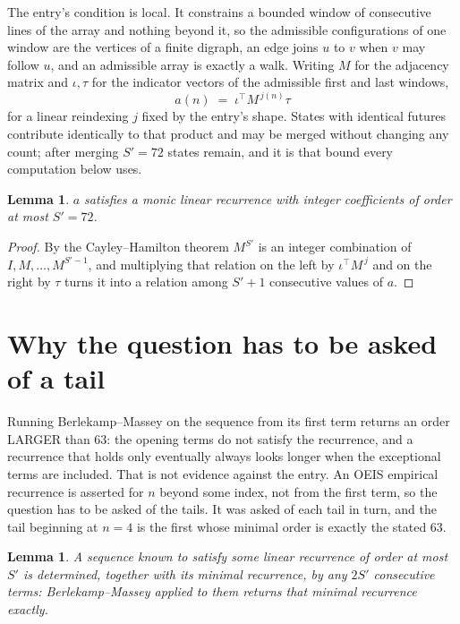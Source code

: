 \documentclass[11pt,a4paper]{article}
\theoremstyle{plain}
\newtheorem{lemma}[theorem]{Lemma}
\theoremstyle{definition}
\begin{document}
The entry's condition is local. It constrains a bounded window of consecutive lines of the
array and nothing beyond it, so the admissible configurations of one window are the vertices of
a finite digraph, an edge joins $u$ to $v$ when $v$ may follow $u$, and an admissible array is
exactly a walk. Writing $M$ for the adjacency matrix and $\iota,\tau$ for the indicator vectors
of the admissible first and last windows,
\[
a(n)\;=\;\iota^{\!\top}M^{\,j(n)}\tau
\]
for a linear reindexing $j$ fixed by the entry's shape. States with identical futures
contribute identically to that product and may be merged without changing any count; after
merging $S'=72$ states remain, and it is that bound every computation below uses.

\begin{lemma}\label{lem:cf}
$a$ satisfies a monic linear recurrence with integer coefficients of order at most $S'=72$.
\end{lemma}

\begin{proof}
By the Cayley--Hamilton theorem $M^{S'}$ is an integer combination of $I,M,\dots,M^{S'-1}$,
and multiplying that relation on the left by $\iota^{\!\top}M^{\,j}$ and on the right by
$\tau$ turns it into a relation among $S'+1$ consecutive values of $a$.
\end{proof}

\section{Why the question has to be asked of a tail}

Running Berlekamp--Massey on the sequence from its first term returns an order LARGER than $63$: the opening terms do not satisfy the recurrence, and a recurrence that holds only eventually always looks longer when the exceptional terms are included. That is not evidence against the entry. An OEIS empirical recurrence is asserted for $n$ beyond some index, not from the first term, so the question has to be asked of the tails. It was asked of each tail in turn, and the tail beginning at $n=4$ is the first whose minimal order is exactly the stated $63$.

\begin{lemma}\label{lem:bm}
A sequence known to satisfy some linear recurrence of order at most $S'$ is determined,
together with its minimal recurrence, by any $2S'$ consecutive terms: Berlekamp--Massey applied
to them returns that minimal recurrence exactly.
\end{lemma}
\end{document}
